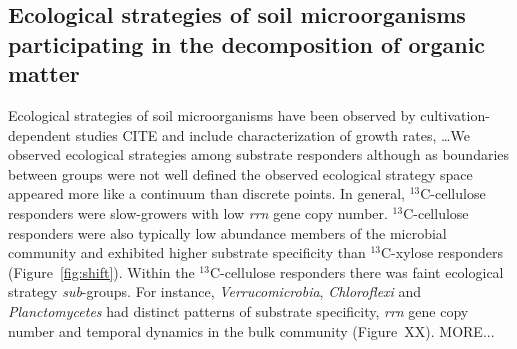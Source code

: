 \subsection{Ecological strategies of soil microorganisms participating in the
    decomposition of organic matter}
\label{sub:ecological_strategies}
Ecological strategies of soil microorganisms have been observed by
cultivation-dependent studies CITE and include characterization of growth
rates, \ldots  We observed ecological strategies among substrate
responders although as boundaries between groups were not well defined the
observed ecological strategy space appeared more like a continuum than discrete
points. In general, $^{13}$C-cellulose responders were slow-growers with low
\textit{rrn} gene copy number. $^{13}$C-cellulose responders were also
typically low abundance members of the microbial community and exhibited higher
substrate specificity than $^{13}$C-xylose responders (Figure~\ref{fig:shift}).
Within the $^{13}$C-cellulose responders there was faint 
ecological strategy \textit{sub}-groups. For instance,
\textit{Verrucomicrobia}, \textit{Chloroflexi} and \textit{Planctomycetes} had
distinct patterns of substrate specificity, \textit{rrn} gene copy number and
temporal dynamics in the bulk community (Figure~XX). MORE...

